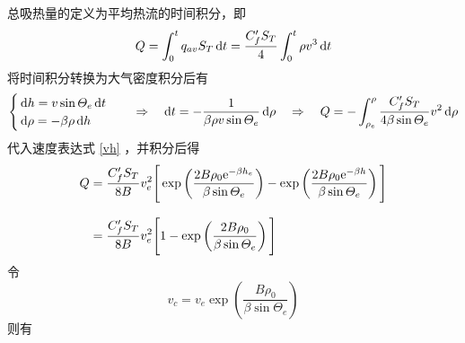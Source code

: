 \sssection[总吸热量$Q$]

总吸热量的定义为平均热流的时间积分，即
\begin{equation}
	Q = \int_0^t q_{av} S_T \,{\rm{d}} t = \dfrac{C'_f S_T}{4} \int_0^t \rho v^3 \, {\rm{d}} t
\end{equation}
将时间积分转换为大气密度积分后有
\begin{equation}
	\begin{cases}
		\, {\rm{d}} h = v \sin \varTheta_e \, {\rm{d}} t \\
		\, {\rm{d}} \rho = - \beta \rho \, {\rm{d}} h
	\end{cases}
	\quad \Rightarrow \quad {\rm{d}} t = -\dfrac{1}{\beta \rho v \sin \varTheta_e}\, {\rm{d}} \rho \quad \Rightarrow \quad 
	Q = - \int_{\rho_e}^{\rho} \dfrac{C'_f S_T}{4 \beta \sin \varTheta_e} v^2 \, {\rm{d}} \rho
\end{equation}
代入速度表达式 \eqref{vh} ，并积分后得
\begin{equation}
	\begin{split}
		Q &= \dfrac{C'_fS_T}{8B}v_e^2 \Bigg[\exp\left(\dfrac{2B\rho_0 {\rm{e}}^{-\beta h_e}}{\beta \sin \varTheta_e}\right) - \exp \left(\dfrac{2B \rho_0 {\rm{e}}^{-\beta h}}{\beta \sin \varTheta_e}\right)\Bigg]\\[0.8em]
		&= \dfrac{C'_fS_T}{8B}v_e^2 \Bigg[1 - \exp \left(\dfrac{2B\rho_0}{\beta \sin \varTheta_e}\right)\Bigg]
	\end{split}
\end{equation}
令
\begin{equation*}
	v_c = v_e \exp\left(\dfrac{B \rho_0}{\beta \sin \varTheta_e}\right)
\end{equation*}
则有



